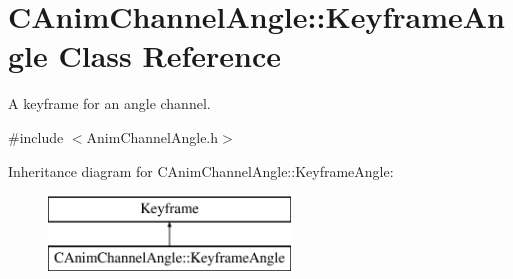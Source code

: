 \hypertarget{class_c_anim_channel_angle_1_1_keyframe_angle}{\section{C\+Anim\+Channel\+Angle\+:\+:Keyframe\+Angle Class Reference}
\label{class_c_anim_channel_angle_1_1_keyframe_angle}
}


A keyframe for an angle channel.  




{\ttfamily \#include $<$Anim\+Channel\+Angle.\+h$>$}

Inheritance diagram for C\+Anim\+Channel\+Angle\+:\+:Keyframe\+Angle\+:\begin{figure}[H]
\begin{center}
\leavevmode
\includegraphics[height=2.000000cm]{class_c_anim_channel_angle_1_1_keyframe_angle}
\end{center}
\end{figure}
